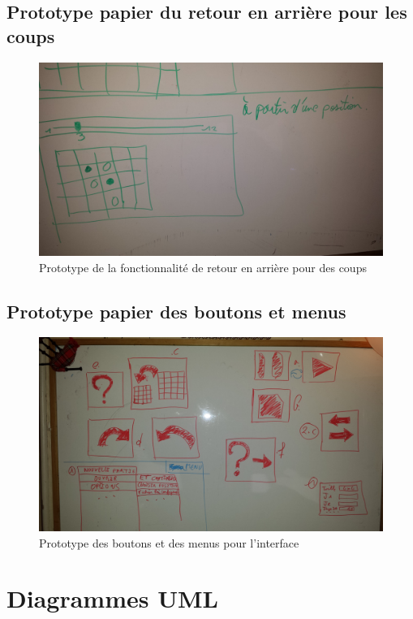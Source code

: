 \documentclass[a4paper,12pt]{report}
\begin{document}
\section{Prototype papier du retour en arrière pour les coups}

\begin{figure}[H]
\centering
\includegraphics[scale=0.1]{Besoins/position.jpg}
\caption{Prototype de la fonctionnalité de retour en arrière pour des coups}
\label{retour}
\end{figure}

\section{Prototype papier des boutons et menus}

\begin{figure}[H]
\centering
\includegraphics[scale=0.1]{Besoins/boutons.jpg}
\caption{Prototype des boutons et des menus pour l'interface}
\label{boutons}
\end{figure}

\chapter{Diagrammes UML}
\end{document}
